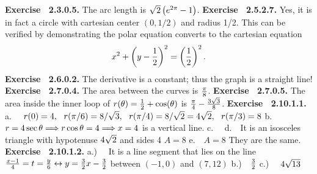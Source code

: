  {\noindent \protect \bf  Exercise ~2.3.0.5.} The arc length is $\protect \sqrt  {2}\left (e^{2\pi }-1\right )$. \protect \newline  \protect \newline  
 {\noindent \protect \bf  Exercise ~2.5.2.7.} Yes, it is in fact a circle with cartesian center $\left (0,1/2\right )$ and radius 1/2. This can be verified by demonstrating the polar equation converts to the cartesian equation $$x^2+\left (y-\protect \frac  {1}{2}\right )^2=\left (\protect \frac  {1}{2}\right )^2. $$ \protect \newline  \protect \newline  
 {\noindent \protect \bf  Exercise ~2.6.0.2.} The derivative is a constant; thus the graph is a straight line! \protect \newline  \protect \newline  
 {\noindent \protect \bf  Exercise ~2.7.0.4.} The area between the curves is $\protect \frac  {\pi }{8}$. \protect \newline  \protect \newline  
 {\noindent \protect \bf  Exercise ~2.7.0.5.} The area inside the inner loop of $r(\theta )=\protect \frac  {1}{2}+\protect \qopname  \relax o{cos}(\theta )$ is $\protect \frac  {\pi }{4}-\protect \frac  {3\protect \sqrt  {3}}{8}$. \protect \newline  \protect \newline  
 {\noindent \protect \bf  Exercise ~2.10.1.1.} a.~~ $r(0) = 4,~~r(\pi /6) = 8/\protect \sqrt  {3},~~r(\pi /4) =8/\protect \sqrt  {2}=4\protect \sqrt  {2},~~r(\pi /3)= 8 $ b.~~ $r=4\protect \qopname  \relax o{sec}{\theta } \DOTSB \protect \Relbar \protect \joinrel \Rightarrow r \protect \qopname  \relax o{cos}{\theta } = 4 \DOTSB \protect \Relbar \protect \joinrel \Rightarrow x=4$ is a vertical line. c.~~ d.~~It is an isosceles triangle with hypotenuse $4\protect \sqrt  {2}$ and sides 4 $A=8$ e.~~$A=8$ They are the same.  \protect \newline  \protect \newline  
 {\noindent \protect \bf  Exercise ~2.10.1.2.} a.)~~ It is a line segment that lies on the line $\protect \frac  {x-1}{4} = t = \protect \frac  {y}{6} \leftrightarrow y = \protect \frac  {3}{2} x - \protect \frac  {3}{2} $ between $(-1,0)$ and $(7,12)$ \protect \newline  b.)~~$\protect \frac  {3}{2}$ \protect \newline  c.)~~ $4\protect \sqrt  {13}$ \protect \newline  \protect \newline  

